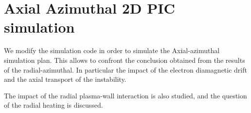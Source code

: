 



\chapter{Axial Azimuthal 2D PIC simulation}
\label{ch-5}


\begin{Chabstract}
  We modify the simulation code \LPPic in order to simulate the Axial-azimuthal simulation plan.
  This allows to confront the conclusion obtained from the results of the radial-azimuthal.
  In particular the impact of the electron diamagnetic drift and the axial transport of the instability.
  
  The impact of the radial plasma-wall interaction is also studied, and the question of the radial heating is discussed. 
\end{Chabstract}

% 
% 

\minitoc





